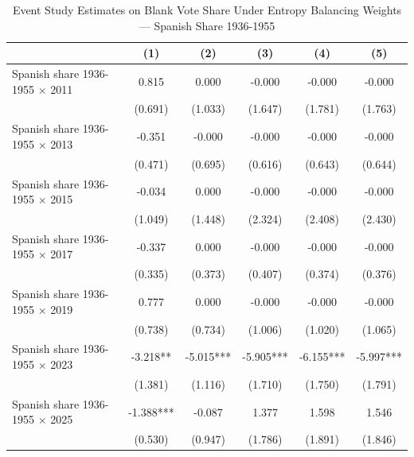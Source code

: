 \begin{table}[!h]
\caption{Event Study Estimates on Blank Vote Share Under Entropy Balancing Weights — Spanish Share 1936-1955}
\renewcommand{\arraystretch}{1.25}
\centering
\begin{tabular}[t]{lccccc}
\hline
  & (1) & (2) & (3) & (4) & (5)\\
\hline
Spanish share 1936-1955 $\times$ 2011 & 0.815 & 0.000 & -0.000 & -0.000 & -0.000\\
 & (0.691) & (1.033) & (1.647) & (1.781) & (1.763)\\
Spanish share 1936-1955 $\times$ 2013 & -0.351 & -0.000 & -0.000 & -0.000 & -0.000\\
 & (0.471) & (0.695) & (0.616) & (0.643) & (0.644)\\
Spanish share 1936-1955 $\times$ 2015 & -0.034 & 0.000 & -0.000 & -0.000 & -0.000\\
 & (1.049) & (1.448) & (2.324) & (2.408) & (2.430)\\
Spanish share 1936-1955 $\times$ 2017 & -0.337 & 0.000 & -0.000 & -0.000 & -0.000\\
 & (0.335) & (0.373) & (0.407) & (0.374) & (0.376)\\
Spanish share 1936-1955 $\times$ 2019 & 0.777 & 0.000 & -0.000 & -0.000 & -0.000\\
 & (0.738) & (0.734) & (1.006) & (1.020) & (1.065)\\
Spanish share 1936-1955 $\times$ 2023 & -3.218** & -5.015*** & -5.905*** & -6.155*** & -5.997***\\
 & (1.381) & (1.116) & (1.710) & (1.750) & (1.791)\\
Spanish share 1936-1955 $\times$ 2025 & -1.388*** & -0.087 & 1.377 & 1.598 & 1.546\\
 & (0.530) & (0.947) & (1.786) & (1.891) & (1.846)\\


\end{tabular}
\end{table}
